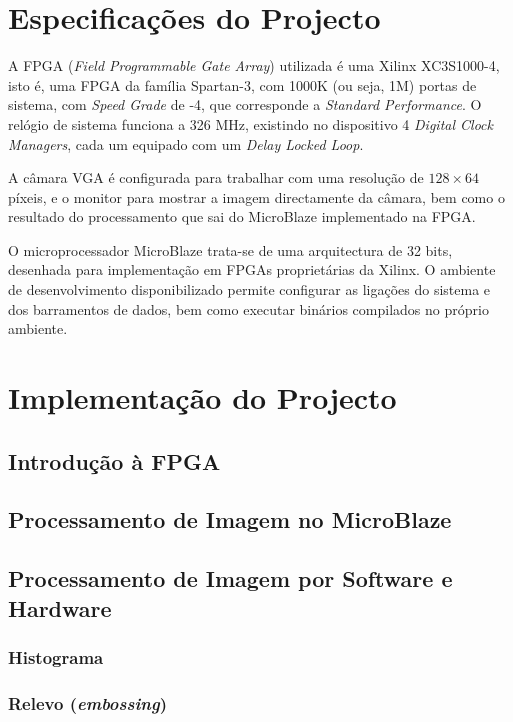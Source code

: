 \documentclass[a4paper]{article}
\begin{document}
\section{Especificações do Projecto}

A FPGA (\textit{Field Programmable Gate Array}) utilizada é uma Xilinx XC3S1000-4, isto é, uma FPGA da família Spartan-3, com 1000K (ou seja, 1M) portas de sistema, com \textit{Speed Grade} de -4, que corresponde a \textit{Standard Performance}. O relógio de sistema funciona a 326 MHz, existindo no dispositivo 4 \textit{Digital Clock Managers}, cada um equipado com um \textit{Delay Locked Loop}\cite{bib:s3datasheet}.

A câmara VGA é configurada para trabalhar com uma resolução de $128\times64$ píxeis, e o monitor para mostrar a imagem directamente da câmara, bem como o resultado do processamento que sai do MicroBlaze implementado na FPGA.

O microprocessador MicroBlaze trata-se de uma arquitectura de 32 bits, desenhada para implementação em FPGAs proprietárias da Xilinx\textregistered\cite{bib:microblaze}. O ambiente de desenvolvimento disponibilizado permite configurar as ligações do sistema e dos barramentos de dados, bem como executar binários compilados no próprio ambiente.

\section{Implementação do Projecto}
\subsection{Introdução à FPGA}
\label{subsec:LEDs}

\subsection{Processamento de Imagem no MicroBlaze\texttrademark}

\subsection{Processamento de Imagem por Software e Hardware}
\subsubsection{Histograma}

\subsubsection{Relevo (\textit{embossing})}
\end{document}
